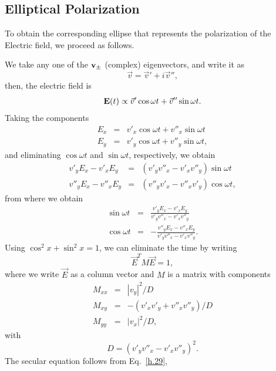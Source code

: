 \documentclass[preprint,12pt]{revtex4}
\begin{document}
\subsection{Elliptical Polarization}

To obtain the corresponding ellipse that represents the polarization
of the Electric field, we proceed as follows.

We take any one of the $\mathbf{v}_{\pm}$ (complex) eigenvectors, and write it as
\begin{equation}\label{w.1}
\vec v=\vec v'+i\vec v''
,
\end{equation} 
then, the electric field is
\begin{equation}\label{w.2}
\mathbf{E}(t)\propto \vec v'\cos\omega t+\vec v''\sin\omega t
.
\end{equation}
Taking the components
\begin{eqnarray}\label{w.3}
E_x&=&v'_x\cos\omega t+v''_x\sin\omega t
\nonumber\\
E_y&=&v'_y\cos\omega t+v''_y\sin\omega t
,
\end{eqnarray}
and 
eliminating $\cos\omega t$ and 
$\sin\omega t$, respectively, we obtain
\begin{eqnarray}\label{w.4}
v'_y E_x-v'_x E_y&=&(v'_y v''_x-v'_x v''_y)\sin\omega t
\nonumber\\
v''_y E_x-v''_x E_y&=&(v''_y v'_x-v''_x v'_y)\cos\omega t
,
\end{eqnarray}
from where we obtain
\begin{eqnarray}\label{w.5}
\sin\omega t&=&\frac{v'_y E_x-v'_x E_y}{v'_y v''_x - v'_x v''_y}
\nonumber\\
\cos\omega t&=&-\frac{v''_y E_x-v''_x E_y}{v'_y v''_x - v'_x v''_y}
.
\end{eqnarray}
Using $\cos^2x+\sin^2x=1$, we can eliminate the time by writing
\begin{equation}\label{w.6}
\vec E^T M \vec E=1
,
\end{equation}
where we write
$\vec E$ as a column vector and $M$ is a matrix with components
\begin{eqnarray}\label{w.8}
	   M_{xx}&=&|v_y|^2/D
\nonumber\\
	   M_{xy}&=&-(v'_x v'_y+v''_x v''_y)/D
\\
M_{yy}&=&|v_x|^2/D
,
\end{eqnarray}
with
\begin{equation}\label{w.9}
D=(v'_y v''_x-v'_x v''_y)^2
.
\end{equation}
The secular equation follows from Eq.~\eqref{h.29},
\end{document}
